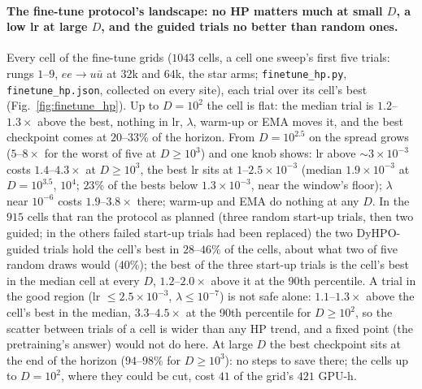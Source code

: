 \documentclass[11pt]{article}
\newcommand{\code}[1]{\texttt{#1}}
\begin{document}
\paragraph{The fine-tune protocol's landscape: no HP matters much at small $D$, a low lr at large $D$, and the guided
trials no better than random ones.} Every cell of the fine-tune grids ($1043$ cells, a cell one sweep's first five trials:
rungs $1$--$9$,
$ee\to u\bar u$ at $32$k and $64$k, the star arms; \code{finetune\_hp.py}, \code{finetune\_hp.json}, collected on every
site), each trial over its cell's best (Fig.~\ref{fig:finetune_hp}). Up to $D=10^2$ the cell is flat: the median trial is
$1.2$--$1.3\times$ above the best, nothing in lr, $\lambda$, warm-up or EMA moves it, and the best checkpoint comes at
$20$--$33\%$ of the horizon. From $D=10^{2.5}$ on the spread grows ($5$--$8\times$ for the worst of five at $D\ge10^3$)
and one knob shows: lr above $\sim3\times10^{-3}$ costs $1.4$--$4.3\times$ at $D\ge10^3$, the best lr sits at
$1$--$2.5\times10^{-3}$ (median $1.9\times10^{-3}$ at $D=10^{3.5}$, $10^4$; $23\%$ of the bests below $1.3\times10^{-3}$, near
the window's floor); $\lambda$ near $10^{-6}$ costs $1.9$--$3.8\times$ there; warm-up and EMA do nothing at any $D$. In the $915$ cells that ran the protocol as
planned (three random start-up trials, then two guided; in the others failed start-up trials had been replaced) the two
DyHPO-guided trials hold the cell's best in $28$--$46\%$ of the cells, about what two of five random draws would ($40\%$);
the best of the three start-up trials is the cell's best in the median cell at every $D$, $1.2$--$2.0\times$ above it at
the 90th percentile. A trial in the good region (lr $\le2.5\times10^{-3}$, $\lambda\le10^{-7}$) is not safe alone: $1.1$--$1.3\times$
above the cell's best in the median, $3.3$--$4.5\times$ at the 90th percentile for $D\ge10^2$, so the scatter between trials
of a cell is wider than any HP trend, and a fixed point (the pretraining's answer) would not do here. At large $D$ the
best checkpoint sits at the end of the horizon ($94$--$98\%$ for $D\ge10^3$): no steps to save there; the cells up to
$D=10^2$, where they could be cut, cost $41$ of the grid's $421$ GPU-h.
\end{document}
